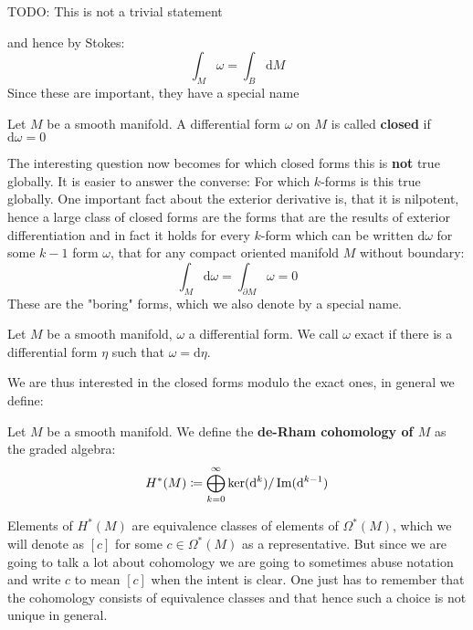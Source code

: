 TODO: This is not a trivial statement

and hence by Stokes:
\[
	\int_M \omega = \int_B \mathrm{d}M
\]
Since these are important, they have a special name
\begin{definition}
Let $M$ be a smooth manifold. A differential form $\omega$ on $M$ is called \textbf{closed}
if $\mathrm{d} \omega = 0$
\end{definition}

The interesting question now becomes for which closed forms this is \textbf{not} true
globally. It is easier to answer the converse: For which $k$-forms is this true globally.
One important fact about the exterior derivative is, that it is nilpotent, hence a large
class of closed forms are the forms that are the results of exterior differentiation and in
fact it holds for every $k$-form which can be written $\mathrm{d}\omega$ for some $k-1$ form $\omega$,
that for any compact oriented manifold $M$ without boundary:
\[
	\int_M \mathrm{d}\omega = \int_{\partial M} \omega = 0
\]
These are the "boring" forms, which we also denote by a special name.
\begin{definition}
Let $M$ be a smooth manifold, $\omega$ a differential form. We call $\omega$ exact if there is a differential
form $\eta$ such that $\omega = \mathrm{d}\eta$.
\end{definition}

We are thus interested in the closed forms modulo the exact ones, in general we define:
\begin{definition}
Let $M$ be a smooth manifold. We define the \textbf{de-Rham cohomology of $M$} as the graded
algebra:
\[
	H^*(M) \coloneqq \bigoplus_{k = 0}^\infty \ker(\mathrm{d}^k)/\operatorname{Im}(\mathrm{d}^{k - 1})
\]
\end{definition}
\begin{remark}
Elements of $H^*(M)$ are equivalence classes of elements of $\Omega^*(M)$, which we will
denote as $[c]$ for some $c \in \Omega^*(M)$ as a representative. But since we are going to
talk a lot about cohomology we are going to sometimes abuse notation and write $c$ to mean $[c]$
when the intent is clear. One just has to remember that the cohomology consists of equivalence classes
and that hence such a choice is not unique in general.
\end{remark}

